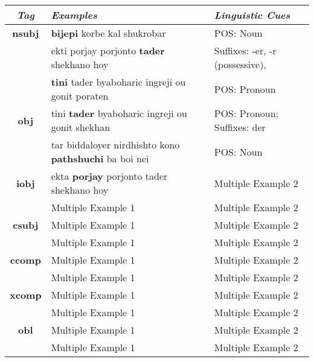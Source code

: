 \documentclass[a4 paper]{article}
\begin{document}
\begin{longtable}{cp{}p{}}
    \toprule
    \textit{Tag} & \textit{Examples} & \textit{Linguistic Cues} \\ 
    \toprule
    \addlinespace[0.5em]
    \textbf{nsubj}
                 & \textbf{bijepi} korbe kal shukrobar
                 & POS: Noun\\
    \addlinespace[0.5em]
                 & ekti porjay porjonto \textbf{tader} shekhano hoy
                 & Suffixes: -er, -r (possessive), \\
    \addlinespace[0.5em]
                 & \textbf{tini} tader byaboharic ingreji ou gonit poraten
                 & POS: Pronoun\\
    \midrule
    \addlinespace[0.5em]
    \textbf{obj}
                 & tini \textbf{tader} byaboharic ingreji ou gonit shekhan
                 & POS: Pronoun; Suffixes: der\\
    \addlinespace[0.5em]
                 & tar biddaloyer nirdhishto kono \textbf{pathshuchi} ba boi nei
                 & POS: Noun \\
    \midrule
    \addlinespace[0.5em]
    \textbf{iobj}
                 & ekta \textbf{porjay} porjonto tader shekhano hoy
                 & Multiple Example 2\\
    \addlinespace[0.5em]
                 & Multiple Example 1 
                 & Multiple Example 2\\
    \midrule
    \addlinespace[0.5em]
    \textbf{csubj}
                 & Multiple Example 1 & Multiple Example 2\\
    \addlinespace[0.5em]
                 & Multiple Example 1 & Multiple Example 2\\
    \midrule
    \addlinespace[0.5em]
    \textbf{ccomp}
                 & Multiple Example 1 & Multiple Example 2\\
    \addlinespace[0.5em]
                 & Multiple Example 1 & Multiple Example 2\\
    \midrule
    \addlinespace[0.5em]
    \textbf{xcomp}
                 & Multiple Example 1 & Multiple Example 2\\
    \addlinespace[0.5em]
                 & Multiple Example 1 & Multiple Example 2\\
    \midrule
    \addlinespace[0.5em]
    \textbf{obl}
                 & Multiple Example 1 & Multiple Example 2\\
    \addlinespace[0.5em]
                 & Multiple Example 1 & Multiple Example 2\\

\end{longtable}
\end{document}
